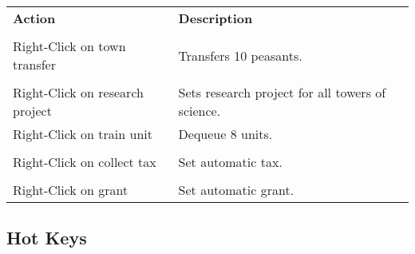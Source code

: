 \begin{tabular}{p{2in} p{2in}}
    \textbf{Action} & \textbf{Description} \\ \\  
    Right-Click on town transfer & Transfers 10 peasants. \\ \\
    Right-Click on research project & Sets research project for all towers of science. \\
    Right-Click on train unit & Dequeue 8 units. \\ \\
    Right-Click on collect tax & Set automatic tax. \\ \\
    Right-Click on grant & Set automatic grant. \\
\end{tabular}

\subsection{\textsf{Hot Keys}}


